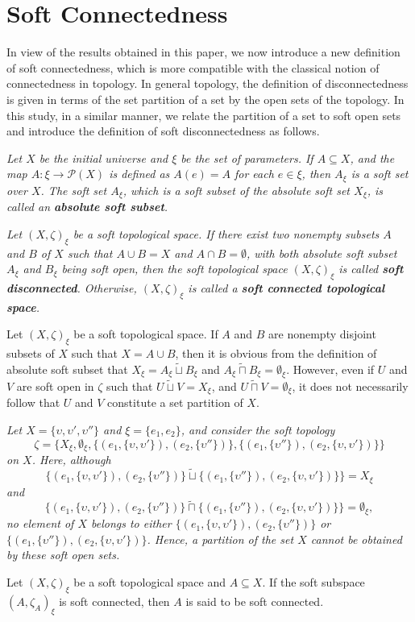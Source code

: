 \documentclass[preprint,12pt]{elsarticle}
\begin{document}
\section{ Soft Connectedness}
In view of the results obtained in this paper, we now introduce a new definition of soft connectedness, which is more compatible with the classical notion of connectedness in topology. In general topology, the definition of disconnectedness is given in terms of the set partition of a set by the open sets of the topology. In this study, in a similar manner, we relate the partition of a set to soft open sets and introduce the definition of soft disconnectedness as follows.

\begin{rem}\em{Let \( X\) be the initial universe and \( \xi \) be the set of parameters. If $A\subseteq X$, and the map $A:\xi \to \mathcal{P}(X)$ is defined as $A(e)=A$ for each $e\in \xi$,  then $A_\xi$ is a  soft set over \( X \). The soft set $A_\xi$, which is a soft subset of the absolute soft set $X_\xi$, is called an \textbf{absolute soft subset}.}
\end{rem}

\begin{defn}\em{
Let $(X, \zeta)_\xi $ be a soft topological space. If there exist two nonempty subsets $A$ and $B$ of $X$ such that $A \cup B = X$ and $A \cap B = \emptyset$, with both absolute soft subset $A_\xi$ and $B_\xi$ being soft open, then the soft topological space $(X, \zeta)_\xi $ is called  \textbf{soft disconnected}. Otherwise, $(X, \zeta)_\xi $ is called a \textbf{soft connected topological space}.}
\end{defn}

Let $(X, \zeta)_\xi $ be a soft topological space. If $A$ and $B$ are nonempty disjoint subsets of $X$ such that $X=A \cup B$, then it is obvious from the definition of absolute soft subset that \(
X_\xi = A_\xi \widetilde{\sqcup} B_\xi\) and \(A_\xi\widetilde{\sqcap} B_\xi=\emptyset_\xi\). However, even if $U$ and $V$ are soft open  in $\zeta$ such that $U\widetilde{\sqcup} V=X_\xi$, and $U\widetilde{\sqcap} V=\emptyset_\xi$, it does not necessarily follow that $U$ and $V$ constitute a set partition of $X$.
\begin{ex}\em{
 Let $X = \{\upsilon,\upsilon',\upsilon''\}$ and $\xi = \{e_1,e_2\}$, and consider the soft topology $$\zeta=\{X_\xi,\emptyset_\xi,\{(e_1,\{\upsilon,\upsilon'\}), (e_2,\{\upsilon''\})\}, \{(e_1,\{\upsilon''\}), (e_2,\{\upsilon,\upsilon'\})\}\}$$ on $X$.  Here, although $$\{(e_1,\{\upsilon,\upsilon'\}), (e_2,\{\upsilon''\})\}\widetilde{\sqcup} \{(e_1,\{\upsilon''\}), (e_2,\{\upsilon,\upsilon'\})\}\}=X_\xi$$  and $$\{(e_1,\{\upsilon,\upsilon'\}), (e_2,\{\upsilon''\})\}\widetilde{\sqcap} \{(e_1,\{\upsilon''\}), (e_2,\{\upsilon,\upsilon'\})\}\}=\emptyset_\xi,$$ no element of $X$ belongs to either $\{(e_1,\{\upsilon,\upsilon'\}), (e_2,\{\upsilon''\})\}$ or $\{(e_1,\{\upsilon''\}), (e_2,\{\upsilon,\upsilon'\})\}$. Hence, a partition of the set $X$ cannot be obtained by these soft open sets.}
\end{ex}
Let $(X, \zeta)_\xi $ be a soft topological space and $A\subseteq X$. If the soft subspace $(A, \zeta_A)_\xi$  is soft connected, then $A$ is said to be soft connected.
\end{document}
